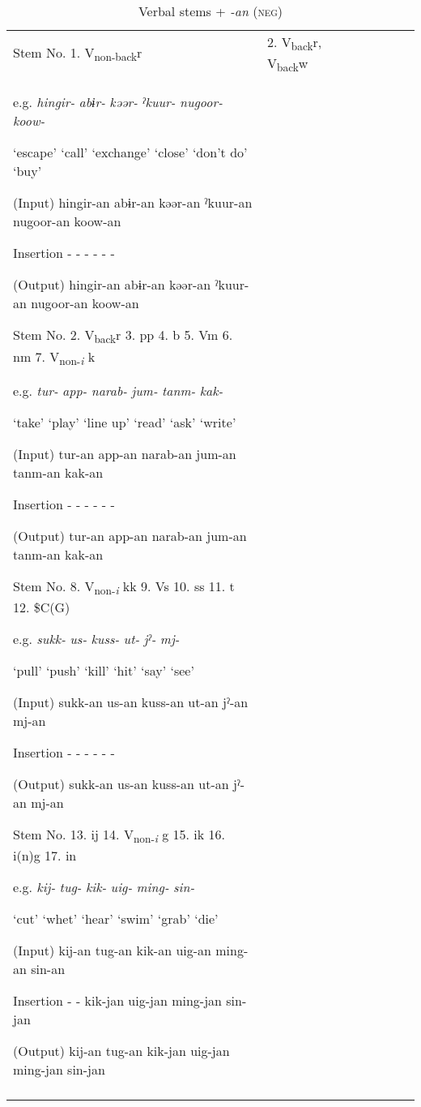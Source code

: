 \begin{table}
\caption{\label{tab:key:60}Verbal stems + \textit{-an} (\textsc{neg})}

\begin{tabularx}{\textwidth}{X llllll}
\lsptoprule
Stem No.  1. V\textsubscript{non-back}r  & 2. V\textsubscript{back}r, V\textsubscript{back}w\\

e.g.  \textit{hingir-}  \textit{abɨr-}  \textit{kəər-}  \textit{ˀkuur-}  \textit{nugoor-}  \textit{koow-}

  ‘escape’  ‘call’  ‘exchange’  ‘close’  ‘don’t do’  ‘buy’

(Input)  hingir-an  abɨr-an  kəər-an  ˀkuur-an  nugoor-an  koow-an

Insertion  -  -  -  -  -  -

(Output)  hingir-an  abɨr-an  kəər-an  ˀkuur-an  nugoor-an  koow-an

Stem No.  2. V\textsubscript{back}r  3. pp  4. b  5. Vm  6. nm  7. V\textsubscript{non-}\textit{\textsubscript{i}} k

e.g.  \textit{tur-}  \textit{app-}  \textit{narab-}  \textit{jum-}  \textit{tanm-}  \textit{kak-}

  ‘take’  ‘play’  ‘line up’  ‘read’  ‘ask’  ‘write’

(Input)  tur-an  app-an  narab-an  jum-an  tanm-an  kak-an

Insertion  -  -  -  -  -  -

(Output)  tur-an  app-an  narab-an  jum-an  tanm-an  kak-an

Stem No.  8. V\textsubscript{non-}\textit{\textsubscript{i}} kk  9. Vs  10. ss  11. t  12. \$C(G)

e.g.  \textit{sukk-}  \textit{us-}  \textit{kuss-}  \textit{ut-}  \textit{jˀ-}  \textit{mj-}

  ‘pull’  ‘push’  ‘kill’  ‘hit’  ‘say’  ‘see’

(Input)  sukk-an  us-an  kuss-an  ut-an  jˀ-an  mj-an

Insertion  -  -  -  -  -  -

(Output)  sukk-an  us-an  kuss-an  ut-an  jˀ-an  mj-an

Stem No.  13. ij  14. V\textsubscript{non-}\textit{\textsubscript{i}} g  15. ik  16. i(n)g    17. in

e.g.  \textit{kij-}  \textit{tug-}  \textit{kik-}  \textit{uig-}  \textit{ming-}  \textit{sin-}

  ‘cut’  ‘whet’  ‘hear’  ‘swim’  ‘grab’  ‘die’

(Input)  kij-an  tug-an  kik-an  uig-an  ming-an  sin-an

Insertion  -  -  kik-jan  uig-jan  ming-jan  sin-jan

(Output)  kij-an  tug-an  kik-jan  uig-jan  ming-jan  sin-jan\\
\lspbottomrule
\end{tabularx}
\end{table}

